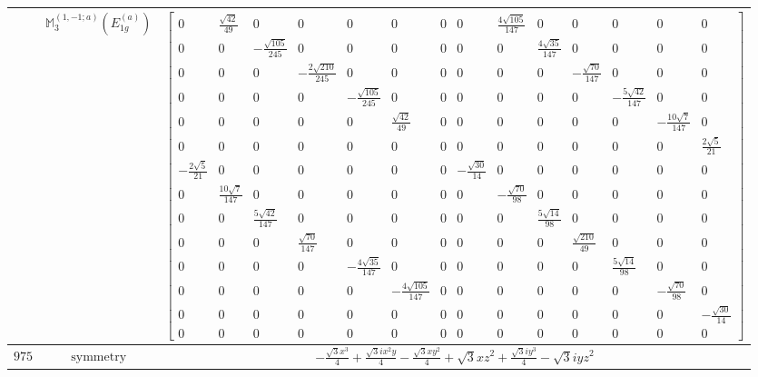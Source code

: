 \documentclass[fleqn,8pt,landscape]{jsarticle}
\begin{document}
\begin{longtable}{ccc}
$  $ & $ \mathbb{M}_{3}^{(1,-1;a)}(E_{1g}^{(a)}) $ & $ \begin{bmatrix} 0 & \frac{\sqrt{42}}{49} & 0 & 0 & 0 & 0 & 0 & 0 & \frac{4 \sqrt{105}}{147} & 0 & 0 & 0 & 0 & 0 \\ 0 & 0 & - \frac{\sqrt{105}}{245} & 0 & 0 & 0 & 0 & 0 & 0 & \frac{4 \sqrt{35}}{147} & 0 & 0 & 0 & 0 \\ 0 & 0 & 0 & - \frac{2 \sqrt{210}}{245} & 0 & 0 & 0 & 0 & 0 & 0 & - \frac{\sqrt{70}}{147} & 0 & 0 & 0 \\ 0 & 0 & 0 & 0 & - \frac{\sqrt{105}}{245} & 0 & 0 & 0 & 0 & 0 & 0 & - \frac{5 \sqrt{42}}{147} & 0 & 0 \\ 0 & 0 & 0 & 0 & 0 & \frac{\sqrt{42}}{49} & 0 & 0 & 0 & 0 & 0 & 0 & - \frac{10 \sqrt{7}}{147} & 0 \\ 0 & 0 & 0 & 0 & 0 & 0 & 0 & 0 & 0 & 0 & 0 & 0 & 0 & \frac{2 \sqrt{5}}{21} \\ - \frac{2 \sqrt{5}}{21} & 0 & 0 & 0 & 0 & 0 & 0 & - \frac{\sqrt{30}}{14} & 0 & 0 & 0 & 0 & 0 & 0 \\ 0 & \frac{10 \sqrt{7}}{147} & 0 & 0 & 0 & 0 & 0 & 0 & - \frac{\sqrt{70}}{98} & 0 & 0 & 0 & 0 & 0 \\ 0 & 0 & \frac{5 \sqrt{42}}{147} & 0 & 0 & 0 & 0 & 0 & 0 & \frac{5 \sqrt{14}}{98} & 0 & 0 & 0 & 0 \\ 0 & 0 & 0 & \frac{\sqrt{70}}{147} & 0 & 0 & 0 & 0 & 0 & 0 & \frac{\sqrt{210}}{49} & 0 & 0 & 0 \\ 0 & 0 & 0 & 0 & - \frac{4 \sqrt{35}}{147} & 0 & 0 & 0 & 0 & 0 & 0 & \frac{5 \sqrt{14}}{98} & 0 & 0 \\ 0 & 0 & 0 & 0 & 0 & - \frac{4 \sqrt{105}}{147} & 0 & 0 & 0 & 0 & 0 & 0 & - \frac{\sqrt{70}}{98} & 0 \\ 0 & 0 & 0 & 0 & 0 & 0 & 0 & 0 & 0 & 0 & 0 & 0 & 0 & - \frac{\sqrt{30}}{14} \\ 0 & 0 & 0 & 0 & 0 & 0 & 0 & 0 & 0 & 0 & 0 & 0 & 0 & 0 \end{bmatrix} $ \\ \hline
$ 975 $ & $ \text{symmetry} $ & $ - \frac{\sqrt{3} x^{3}}{4} + \frac{\sqrt{3} i x^{2} y}{4} - \frac{\sqrt{3} x y^{2}}{4} + \sqrt{3} x z^{2} + \frac{\sqrt{3} i y^{3}}{4} - \sqrt{3} i y z^{2} $ \\

\end{longtable}
\end{document}
